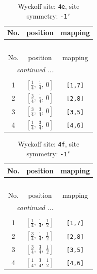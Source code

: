 \documentclass[fleqn,8pt]{jsarticle}
\begin{document}
\begin{longtable}{ccc}
\caption{Wyckoff site: {\tt 4e}, site symmetry: {\tt -1'}}
 \\
 \hline \hline
No. & position & mapping \\ \hline \endfirsthead

\multicolumn{2}{l}{\tablename\ \thetable{}} \\
 \hline \hline
No. & position & mapping \\ \hline \endhead

 \hline \hline
\multicolumn{2}{r}{\footnotesize\it continued ...} \\ \endfoot

 \hline \hline
\multicolumn{2}{r}{} \\ \endlastfoot

1 & $\left[ \frac{1}{4},\, \frac{1}{4},\, 0 \right]$ & {\tt [1,7]} \\ \hline
2 & $\left[ \frac{3}{4},\, \frac{1}{4},\, 0 \right]$ & {\tt [2,8]} \\ \hline
3 & $\left[ \frac{3}{4},\, \frac{3}{4},\, 0 \right]$ & {\tt [3,5]} \\ \hline
4 & $\left[ \frac{1}{4},\, \frac{3}{4},\, 0 \right]$ & {\tt [4,6]} \\
\end{longtable}
\renewcommand{\arraystretch}{1.2}
\begin{longtable}{ccc}
\caption{Wyckoff site: {\tt 4f}, site symmetry: {\tt -1'}}
 \\
 \hline \hline
No. & position & mapping \\ \hline \endfirsthead

\multicolumn{2}{l}{\tablename\ \thetable{}} \\
 \hline \hline
No. & position & mapping \\ \hline \endhead

 \hline \hline
\multicolumn{2}{r}{\footnotesize\it continued ...} \\ \endfoot

 \hline \hline
\multicolumn{2}{r}{} \\ \endlastfoot

1 & $\left[ \frac{1}{4},\, \frac{1}{4},\, \frac{1}{2} \right]$ & {\tt [1,7]} \\ \hline
2 & $\left[ \frac{3}{4},\, \frac{1}{4},\, \frac{1}{2} \right]$ & {\tt [2,8]} \\ \hline
3 & $\left[ \frac{3}{4},\, \frac{3}{4},\, \frac{1}{2} \right]$ & {\tt [3,5]} \\ \hline
4 & $\left[ \frac{1}{4},\, \frac{3}{4},\, \frac{1}{2} \right]$ & {\tt [4,6]} \\
\end{longtable}
\end{document}
